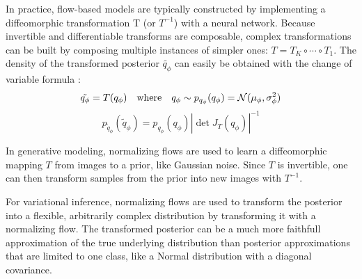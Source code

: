 In practice, flow-based models are typically constructed by implementing a diffeomorphic transformation T (or $T^{-1}$) with a neural network.
Because invertible and differentiable transforms are composable, complex transformations can be built by composing multiple instances of simpler ones: $T=T_K \circ \cdots \circ T_1$.
The density of the transformed posterior $\tilde{q_{\phi}}$ can easily be obtained with the change of variable formula \parencite{bogachev2007measure}:
\begin{equation}
    \tilde{q_{\phi}} = T(q_{\phi}) \quad \text{where} \quad q_{\phi} \sim p_{q_{\phi}}(q_{\phi}) = \mathcal{N}(\mu_{\phi}, \sigma^2_{\phi})
\end{equation}
\begin{equation}
    \label{eq:changeofvariables}
    p_{\tilde{q}_{\phi}}(\tilde{q}_{\phi}) = p_{q_{\phi}}(q_{\phi})|\det J_T(q_{\phi})|^{-1}
\end{equation}

In generative modeling, normalizing flows are used to learn a diffeomorphic mapping $T$ from images to a prior, like Gaussian noise.
Since $T$ is invertible, one can then transform samples from the prior into new images with $T^{-1}$.

For variational inference, normalizing flows are used to transform the posterior into a flexible, arbitrarily complex distribution by transforming it with a normalizing flow.
The transformed posterior can be a much more faithfull approximation of the true underlying distribution than posterior approximations that are limited to one class, like a Normal distribution with a diagonal covariance.

